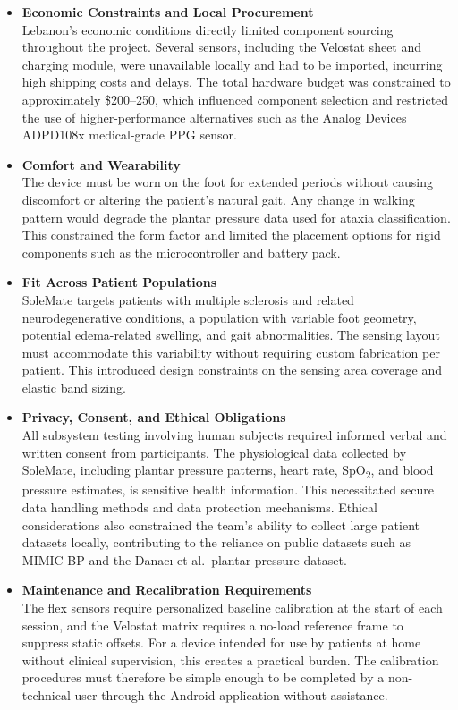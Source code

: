 \begin{itemize}
    \item \textbf{Economic Constraints and Local Procurement}\\
    Lebanon's economic conditions directly limited component sourcing throughout the project. Several sensors, including the Velostat sheet and charging module, were unavailable locally and had to be imported, incurring high shipping costs and delays. The total hardware budget was constrained to approximately \$200--250, which influenced component selection and restricted the use of higher-performance alternatives such as the Analog Devices ADPD108x medical-grade PPG sensor.
    \item \textbf{Comfort and Wearability}\\
    The device must be worn on the foot for extended periods without causing discomfort or altering the patient's natural gait. Any change in walking pattern would degrade the plantar pressure data used for ataxia classification. This constrained the form factor and limited the placement options for rigid components such as the microcontroller and battery pack.
    \item \textbf{Fit Across Patient Populations}\\
    SoleMate targets patients with multiple sclerosis and related neurodegenerative conditions, a population with variable foot geometry, potential edema-related swelling, and gait abnormalities. The sensing layout must accommodate this variability without requiring custom fabrication per patient. This introduced design constraints on the sensing area coverage and elastic band sizing.
    \item \textbf{Privacy, Consent, and Ethical Obligations}\\
    All subsystem testing involving human subjects required informed verbal and written consent from participants. The physiological data collected by SoleMate, including plantar pressure patterns, heart rate, SpO\textsubscript{2}, and blood pressure estimates, is sensitive health information. This necessitated secure data handling methods and data protection mechanisms. Ethical considerations also constrained the team's ability to collect large patient datasets locally, contributing to the reliance on public datasets such as MIMIC-BP and the Danacı et al.\ plantar pressure dataset.
    \item \textbf{Maintenance and Recalibration Requirements}\\
    The flex sensors require personalized baseline calibration at the start of each session, and the Velostat matrix requires a no-load reference frame to suppress static offsets. For a device intended for use by patients at home without clinical supervision, this creates a practical burden. The calibration procedures must therefore be simple enough to be completed by a non-technical user through the Android application without assistance.

\end{itemize}
